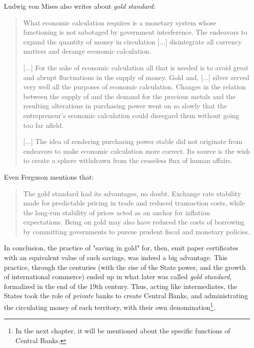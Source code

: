 \documentclass[12pt,a4paper,twoside]{book}
\begin{document}
Ludwig von Mises also writes about \textit{gold standard}:

\begin{quotation}
What economic calculation requires is a monetary system whose functioning is not sabotaged by government interference. The endeavors to expand the quantity of money in circulation [...] disintegrate all currency matters and derange economic calculation.

[...] For the sake of economic calculation all that is needed is to avoid great and abrupt fluctuations in the supply of money. Gold and, [...] silver served very well all the purposes of economic calculation. Changes in the relation between the supply of and the demand for the precious metals and the resulting alterations in purchasing power went on so slowly that the entrepreneur's economic calculation could disregard them without going too far afield. 

[...] The idea of rendering purchasing power stable did not originate from endeavors to make economic calculation more correct. Its source is the wish to create a sphere withdrawn from the ceaseless flux of human affairs.	\cite[pp. 225-226]{mises:ha}
\end{quotation}

Even Ferguson mentions that:

\begin{quotation}
The gold standard had its advantages, no doubt. Exchange rate stability made for predictable pricing in trade and reduced transaction costs, while the long-run stability of prices acted as an anchor for inflation expectations. Being on gold may also have reduced the costs of borrowing by committing governments to pursue prudent fiscal and monetary policies. \cite[pp. 58]{ferguson:ascent-money}
\end{quotation}

In conclusion, the practice of "saving in gold" for, then, emit paper certificates with an equivalent value of such savings, was indeed a big advantage. This practice, through the centuries (with the rise of the State power, and the growth of international commerce) ended up in what later was called \textit{gold standard}, formalized in the end of the 19th century. Thus, acting like intermediates, the States took the role of \textit{private} banks to create Central Banks, and administrating the circulating money of each territory, with their own denomination\footnote{In the next chapter, it will be mentioned about the specific functions of Central Banks.}.
\end{document}
